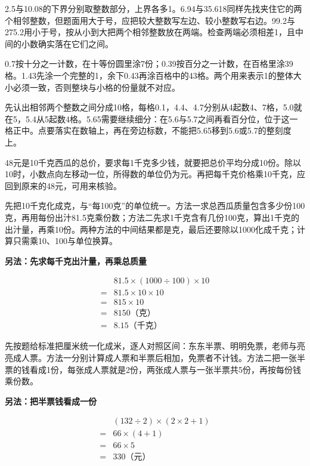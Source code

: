 \documentclass[multi=snippet,border=0pt]{standalone}
\newenvironment{snippet}[3]{\begin{minipage}{#1bp}\color{answerred}\fontsize{#2}{#3}\selectfont\raggedright}{\end{minipage}}
\begin{document}
\begin{snippet}{505}{11.5}{14}2.5与10.08的下界分别取整数部分，上界各多1。6.94与35.618同样先找夹住它的两个相邻整数，但题面用大于号，应把较大整数写左边、较小整数写右边。99.2与275.2用小于号，按从小到大把两个相邻整数放在两端。检查两端必须相差1，且中间的小数确实落在它们之间。\end{snippet}
\begin{snippet}{505}{11.5}{14}0.7按十分之一计数，在十等份圆里涂7份；0.39按百分之一计数，在百格里涂39格。1.43先涂一个完整的1，余下0.43再涂百格中的43格。两个用来表示1的整体大小必须一致，否则整块与小格的份量就不对应。\end{snippet}
\begin{snippet}{505}{11.5}{14}先认出相邻两个整数之间分成10格，每格0.1，4.4、4.7分别从4起数4、7格，5.0就在5，5.4从5起数4格。5.65需要继续细分：在5.6与5.7之间再看百分位，位于这一格正中。点要落实在数轴上，再在旁边标数，不能把5.65移到5.6或5.7的整刻度上。\end{snippet}
\begin{snippet}{505}{11.5}{14}48元是10千克西瓜的总价，要求每1千克多少钱，就要把总价平均分成10份。除以10时，小数点向左移动一位，所得数的单位仍为元。再把每千克价格乘10千克，应回到原来的48元，可用来核验。\end{snippet}
\begin{snippet}{505}{11.5}{14}先把10千克化成克，与“每100克”的单位统一。方法一求总西瓜质量包含多少份100克，再用每份出汁81.5克乘份数；方法二先求1千克含有几份100克，算出1千克的出汁量，再乘10份。两种方法的中间结果都是克，最后还要除以1000化成千克；计算只需乘10、100与单位换算。\par \textbf{另法：先求每千克出汁量，再乘总质量}\par \[\begin{aligned}&81.5\times(1000\div100)\times10\\={}&81.5\times10\times10\\={}&815\times10\\={}&8150\text{（克）}\\={}&8.15\text{（千克）}\end{aligned}\]\end{snippet}
\begin{snippet}{505}{11.5}{14}先按题给标准把厘米统一化成米，逐人对照区间：东东半票、明明免票，老师与亮亮成人票。方法一分别计算成人票和半票后相加，免票者不计钱。方法二把一张半票的钱看成1份，每张成人票就是2份，两张成人票与一张半票共5份，再按每份钱乘份数。\par \textbf{另法：把半票钱看成一份}\par \[\begin{aligned}&(132\div2)\times(2\times2+1)\\={}&66\times(4+1)\\={}&66\times5\\={}&330\text{（元）}\end{aligned}\]\end{snippet}
\end{document}

